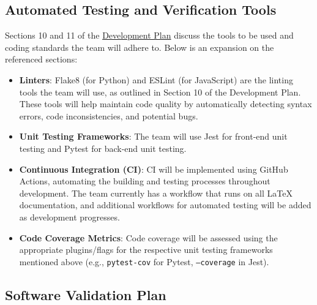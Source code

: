\documentclass[12pt, titlepage]{article}
\begin{document}
\subsection{Automated Testing and Verification Tools} \label{testingTools}
Sections 10 and 11 of the
\href{https://github.com/SumanyaG/Alkalytics/blob/main/docs/DevelopmentPlan/DevelopmentPlan.pdf}{Development
Plan} discuss the tools to be used and coding standards the team will adhere to.
Below is an expansion on the referenced sections:
\begin{itemize}
  \item \textbf{Linters}: Flake8 (for Python) and ESLint (for JavaScript) are
  the linting tools the team will use, as outlined in Section 10 of the
  Development Plan. These tools will help maintain code quality by automatically
  detecting syntax errors, code inconsistencies, and potential bugs.
  \item \textbf{Unit Testing Frameworks}: The team will use Jest for front-end
  unit testing and Pytest for back-end unit testing.
  \item \textbf{Continuous Integration (CI)}: CI will be implemented using
  GitHub Actions, automating the building and testing processes throughout
  development. The team currently has a workflow that runs on all \LaTeX{}
  documentation, and additional workflows for automated testing will be added as
  development progresses. 
  \item \textbf{Code Coverage Metrics}: Code coverage will be assessed using
  the appropriate plugins/flags for the respective unit testing frameworks
  mentioned above (e.g., \texttt{pytest-cov} for Pytest, \texttt{--coverage} in Jest).
\end{itemize}

\subsection{Software Validation Plan}



\end{document}
